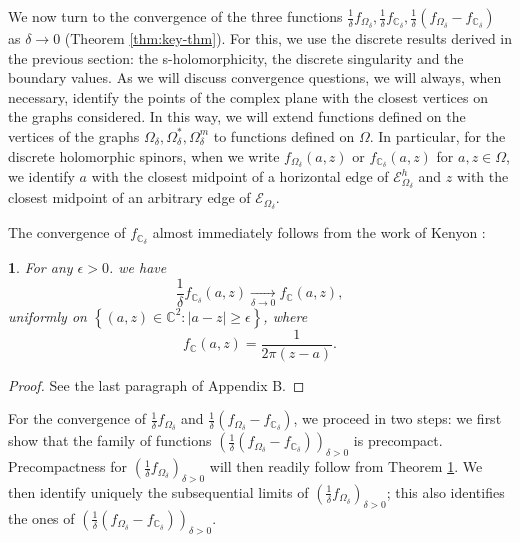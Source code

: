 \documentclass[oneside,english]{amsart}
\numberwithin{equation}{section}
\numberwithin{figure}{section}
\theoremstyle{plain}
\theoremstyle{plain}
\newtheorem{thm}{\protect\theoremname}
\theoremstyle{plain}
\theoremstyle{plain}
\theoremstyle{plain}
\theoremstyle{definition}
\theoremstyle{remark}
\providecommand{\theoremname}{Theorem}
\providecommand{\theoremname}{Theorem}
\begin{document}
We now turn to the convergence of the three functions $\frac{1}{\delta}f_{\Omega_{\delta}},\frac{1}{\delta}f_{\mathbb{C}_{\delta}},\frac{1}{\delta}\left(f_{\Omega_{\delta}}-f_{\mathbb{C}_{\delta}}\right)$
as $\delta\to0$ (Theorem \ref{thm:key-thm}). For this, we use the
discrete results derived in the previous section: the s-holomorphicity,
the discrete singularity and the boundary values. As we will discuss
convergence questions, we will always, when necessary, identify the
points of the complex plane with the closest vertices on the graphs
considered. In this way, we will extend functions defined on the vertices
of the graphs $\Omega_{\delta},\Omega_{\delta}^{*},\Omega_{\delta}^{m}$
to functions defined on $\Omega$. In particular, for the discrete
holomorphic spinors, when we write $f_{\Omega_{\delta}}\left(a,z\right)$
or $f_{\mathbb{C}_{\delta}}\left(a,z\right)$ for $a,z\in\Omega$,
we identify $a$ with the closest midpoint of a horizontal edge of
$\mathcal{E}_{\Omega_{\delta}}^{h}$ and $z$ with the closest  midpoint
of an arbitrary edge of $\mathcal{E}_{\Omega_{\delta}}$. 

The convergence of $f_{\mathbb{C}_{\delta}}$ almost immediately follows
from the work of Kenyon \cite{kenyon-i}:
\begin{thm}
\label{thm:full-plane-spinor-convergence}For any $\epsilon>0$. we
have
\[
\frac{1}{\delta}f_{\mathbb{C}_{\delta}}\left(a,z\right)\underset{\delta\to0}{\longrightarrow}f_{\mathbb{C}}\left(a,z\right),
\]
uniformly on $\left\{ \left(a,z\right)\in\mathbb{C}^{2}:\left|a-z\right|\geq\epsilon\right\} $,
where 
\[
f_{\mathbb{C}}\left(a,z\right)=\frac{1}{2\pi\left(z-a\right)}.
\]
\end{thm}
\begin{proof}
See the last paragraph of Appendix B.
\end{proof}
For the convergence of $\frac{1}{\delta}f_{\Omega_{\delta}}$ and
$\frac{1}{\delta}\left(f_{\Omega_{\delta}}-f_{\mathbb{C}_{\delta}}\right)$,
we proceed in two steps: we first show that the family of functions
$\left(\frac{1}{\delta}\left(f_{\Omega_{\delta}}-f_{\mathbb{C}_{\delta}}\right)\right)_{\delta>0}$
is precompact. Precompactness for $\left(\frac{1}{\delta}f_{\Omega_{\delta}}\right)_{\delta>0}$
will then readily follow from Theorem \ref{thm:full-plane-spinor-convergence}.
We then identify uniquely the subsequential limits of $\left(\frac{1}{\delta}f_{\Omega_{\delta}}\right)_{\delta>0}$;
this also identifies the ones of $\left(\frac{1}{\delta}\left(f_{\Omega_{\delta}}-f_{\mathbb{C}_{\delta}}\right)\right)_{\delta>0}$.
\end{document}
